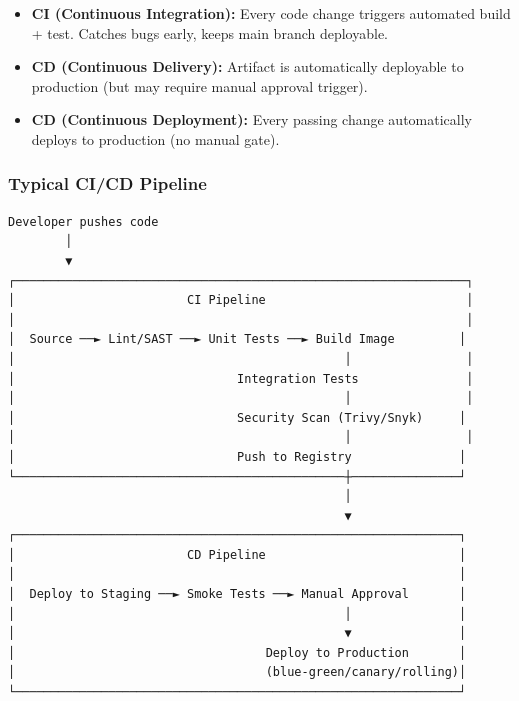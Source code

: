 \documentclass[11pt]{article}
\providecommand{\tightlist}{\setlength{\itemsep}{1pt}\setlength{\parskip}{0pt}}
\begin{document}
\begin{itemize}
\tightlist
\item
  \textbf{CI (Continuous Integration):} Every code change triggers automated build + test. Catches bugs early, keeps main branch deployable.
\item
  \textbf{CD (Continuous Delivery):} Artifact is automatically deployable to production (but may require manual approval trigger).
\item
  \textbf{CD (Continuous Deployment):} Every passing change automatically deploys to production (no manual gate).
\end{itemize}

\subsubsection{Typical CI/CD Pipeline}\label{typical-cicd-pipeline}

\setcodelang{}

\begin{verbatim}
Developer pushes code
        │
        ▼
┌───────────────────────────────────────────────────────────────┐
│                        CI Pipeline                            │
│                                                               │
│  Source ──► Lint/SAST ──► Unit Tests ──► Build Image         │
│                                              │                │
│                               Integration Tests               │
│                                              │                │
│                               Security Scan (Trivy/Snyk)     │
│                                              │                │
│                               Push to Registry               │
└──────────────────────────────────────────────┼───────────────┘
                                               │
                                               ▼
┌──────────────────────────────────────────────────────────────┐
│                        CD Pipeline                           │
│                                                              │
│  Deploy to Staging ──► Smoke Tests ──► Manual Approval       │
│                                              │               │
│                                              ▼               │
│                                   Deploy to Production       │
│                                   (blue-green/canary/rolling)│
└──────────────────────────────────────────────────────────────┘
\end{verbatim}
\end{document}
